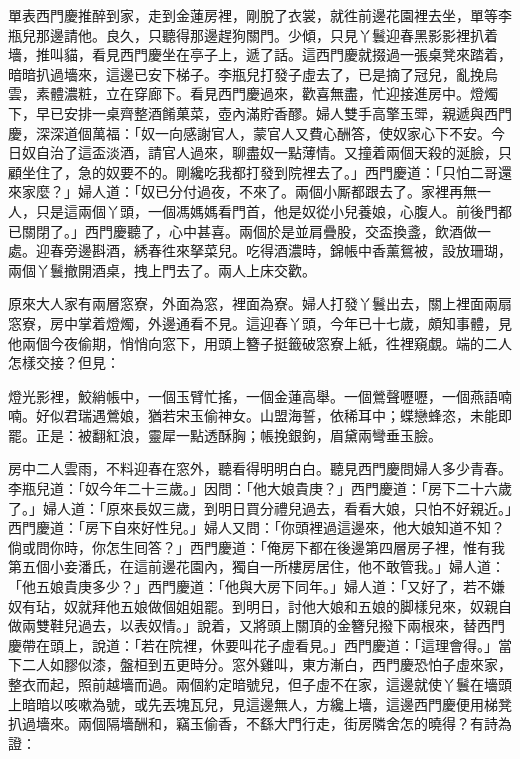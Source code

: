 單表西門慶推醉到家，走到金蓮房裡，剛脫了衣裳，就徃前邊花園裡去坐，單等李瓶兒那邊請他。良久，只聽得那邊趕狗關門。{}少傾，只見丫鬟迎春黑影影裡扒着墻，推叫貓，{}看見西門慶坐在亭子上，遞了話。這西門慶就掇過一張桌凳來踏着，暗暗扒過墻來，這邊已安下梯子。李瓶兒打發子虛去了，已是摘了冠兒，亂挽烏雲，素體濃粧，立在穿廊下。{}看見西門慶過來，歡喜無盡，忙迎接進房中。燈燭下，早已安排一桌齊整酒餚菓菜，壺內滿貯香醪。婦人雙手高擎玉斝，親遞與西門慶，深深道個萬福：「奴一向感謝官人，蒙官人又費心酬答，使奴家心下不安。今日奴自治了這盃淡酒，請官人過來，聊盡奴一點薄情。{}又撞着兩個天殺的涎臉，只顧坐住了，急的奴要不的。剛纔吃我都打發到院裡去了。」西門慶道：「只怕二哥還來家麼？」婦人道：「奴已分付過夜，不來了。兩個小厮都跟去了。家裡再無一人，只是這兩個丫頭，一個馮媽媽看門首，他是奴從小兒養娘，心腹人。前後門都已關閉了。」西門慶聽了，心中甚喜。兩個於是並肩疊股，交盃換盞，飲酒做一處。迎春旁邊斟酒，綉春徃來拏菜兒。吃得酒濃時，錦帳中香薰鴛被，設放珊瑚，兩個丫鬟撤開酒桌，拽上門去了。兩人上床交歡。

原來大人家有兩層窓寮，外面為窓，裡面為寮。婦人打發丫鬟出去，關上裡面兩扇窓寮，房中掌着燈燭，外邊通看不見。這迎春丫頭，今年已十七歲，頗知事體，見他兩個今夜偷期，悄悄向窓下，用頭上簪子挺籤破窓寮上紙，徃裡窺覷。端的二人怎樣交接？但見：

\begin{myquote}
燈光影裡，鮫綃帳中，一個玉臂忙搖，一個金蓮高舉。一個鶯聲嚦嚦，一個燕語喃喃。好似君瑞遇鶯娘，猶若宋玉偷神女。山盟海誓，依稀耳中；蝶戀蜂恣，未能即罷。正是：被翻紅浪，靈犀一點透酥胸；帳挽銀鉤，眉黛兩彎垂玉臉。
\end{myquote}

房中二人雲雨，不料迎春在窓外，聽看得明明白白。聽見西門慶問婦人多少青春。李瓶兒道：「奴今年二十三歲。」因問：「他大娘貴庚？」西門慶道：「房下二十六歲了。」婦人道：「原來長奴三歲，到明日買分禮兒過去，看看大娘，只怕不好親近。」{}西門慶道：「房下自來好性兒。」婦人又問：「你頭裡過這邊來，他大娘知道不知？倘或問你時，你怎生囘答？」西門慶道：「俺房下都在後邊第四層房子裡，惟有我第五個小妾潘氏，在這前邊花園內，獨自一所樓房居住，他不敢管我。」婦人道：「他五娘貴庚多少？」西門慶道：「他與大房下同年。」婦人道：「又好了，若不嫌奴有玷，奴就拜他五娘做個姐姐罷。到明日，討他大娘和五娘的脚樣兒來，奴親自做兩雙鞋兒過去，以表奴情。」說着，又將頭上關頂的金簪兒撥下兩根來，替西門慶帶在頭上，說道：「若在院裡，休要叫花子虛看見。」西門慶道：「這理會得。」當下二人如膠似漆，盤桓到五更時分。窓外雞叫，東方漸白，西門慶恐怕子虛來家，整衣而起，照前越墻而過。兩個約定暗號兒，但子虛不在家，這邊就使丫鬟在墻頭上暗暗以咳嗽為號，或先丟塊瓦兒，見這邊無人，方纔上墻，這邊西門慶便用梯凳扒過墻來。兩個隔墻酬和，竊玉偷香，不繇大門行走，街房隣舍怎的曉得？有詩為證：

